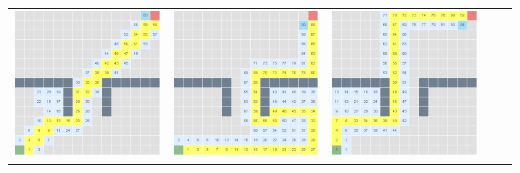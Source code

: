 \documentclass{article}
\begin{document}
\begin{center}
\begin{tabular}{c c c c c}
\includegraphics[scale=0.15]{images/scr12.png} &
\includegraphics[scale=0.15]{images/scr13.png} &
\includegraphics[scale=0.15]{images/scr14.png} \\

\end{tabular}
\end{center}
\end{document}
